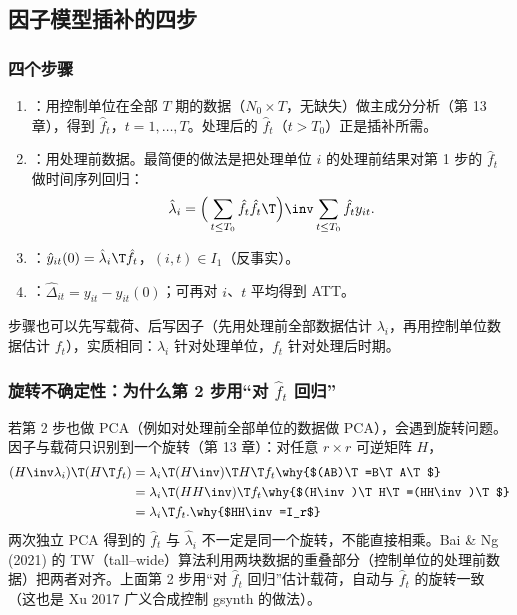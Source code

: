 \subsection{因子模型插补的四步}\label{sec:U16-mc-steps}

\subsubsection{四个步骤}

\begin{method}
\begin{enumerate}
  \item {}：用控制单位在全部 $T$ 期的数据（$N_0\times T$，无缺失）做主成分分析（第 13 章），得到 $\hat f_t$，$t=1,\dots,T$。处理后的 $\hat f_t$（$t>T_0$）正是插补所需。
  \item {}：用处理前数据。最简便的做法是把处理单位 $i$ 的处理前结果对第 1 步的 $\hat f_t$ 做时间序列回归：
  \[
  \hat\lambda_i=\Big(\sum_{t\le T_0}\hat f_t\hat f_t\T\Big)\inv\sum_{t\le T_0}\hat f_ty_{it}.
  \]
  \item {}：$\hat y_{it}(0)=\hat\lambda_i\T\hat f_t$，$(i,t)\in I_1$（反事实）。
  \item {}：$\hat\Delta_{it}=y_{it}-\hat y_{it}(0)$；可再对 $i$、$t$ 平均得到 ATT。
\end{enumerate}
\end{method}
步骤也可以先写载荷、后写因子（先用处理前全部数据估计 $\lambda_i$，再用控制单位数据估计 $f_t$），实质相同：$\lambda_i$ 针对处理单位，$f_t$ 针对处理后时期。

\subsubsection{旋转不确定性：为什么第 2 步用“对 \texorpdfstring{$\hat f_t$}{f-hat} 回归”}

若第 2 步也做 PCA（例如对处理前全部单位的数据做 PCA），会遇到旋转问题。因子与载荷只识别到一个旋转（第 13 章）：对任意 $r\times r$ 可逆矩阵 $H$，
\begin{align*}
(H\inv\lambda_i)\T(H\T f_t) &= \lambda_i\T(H\inv)\T H\T f_t \why{$(AB)\T=B\T A\T$}\\
&= \lambda_i\T(HH\inv)\T f_t \why{$(H\inv)\T H\T=(HH\inv)\T$}\\
&= \lambda_i\T f_t. \why{$HH\inv=I_r$}
\end{align*}
两次独立 PCA 得到的 $\hat f_t$ 与 $\hat\lambda_i$ 不一定是同一个旋转，不能直接相乘。Bai \& Ng (2021) 的 TW（tall--wide）算法利用两块数据的重叠部分（控制单位的处理前数据）把两者对齐。上面第 2 步用“对 $\hat f_t$ 回归”估计载荷，自动与 $\hat f_t$ 的旋转一致（这也是 Xu 2017 广义合成控制 gsynth 的做法）。

